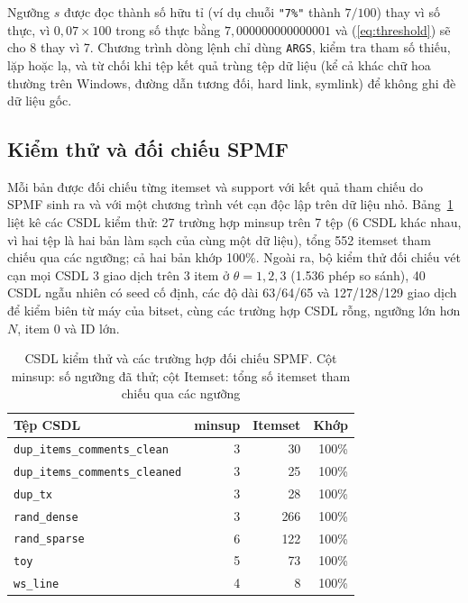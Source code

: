 Ngưỡng $s$ được đọc thành số hữu tỉ (ví dụ chuỗi \texttt{"7\%"} thành $7/100$) thay vì số thực, vì
$0{,}07 \times 100$ trong số thực bằng $7{,}000000000000001$ và (\ref{eq:threshold}) sẽ cho 8 thay vì 7.
Chương trình dòng lệnh chỉ dùng \texttt{ARGS}, kiểm tra tham số thiếu, lặp hoặc lạ, và từ chối khi tệp kết
quả trùng tệp dữ liệu (kể cả khác chữ hoa thường trên Windows, đường dẫn tương đối, hard link, symlink) để
không ghi đè dữ liệu gốc.

\subsection{Kiểm thử và đối chiếu SPMF}

Mỗi bản được đối chiếu từng itemset và support với kết quả tham chiếu do SPMF sinh ra và với một chương trình
vét cạn độc lập trên dữ liệu nhỏ. Bảng~\ref{tab:fixtures} liệt kê các CSDL kiểm thử: 27 trường hợp minsup trên
7 tệp (6 CSDL khác nhau, vì hai tệp là hai bản làm sạch của cùng một dữ liệu), tổng 552 itemset tham chiếu
qua các ngưỡng; cả hai bản khớp 100\%. Ngoài ra, bộ kiểm thử đối chiếu vét cạn mọi CSDL 3 giao dịch trên 3 item ở
$\theta = 1, 2, 3$ (1.536 phép so sánh), 40 CSDL ngẫu nhiên có seed cố định, các độ dài 63/64/65 và 127/128/129
giao dịch để kiểm biên từ máy của bitset, cùng các trường hợp CSDL rỗng, ngưỡng lớn hơn $N$, item 0 và ID lớn.

\begin{table}[t]
\caption{CSDL kiểm thử và các trường hợp đối chiếu SPMF. Cột minsup: số ngưỡng đã thử; cột Itemset: tổng
số itemset tham chiếu qua các ngưỡng}
\label{tab:fixtures}
\centering
\footnotesize
\setlength{\tabcolsep}{4pt}
\begin{tabular}{@{}lrrr@{}}
\toprule
Tệp CSDL & minsup & Itemset & Khớp \\
\midrule
\texttt{dup\_items\_comments\_clean} & 3 & 30 & 100\% \\
\texttt{dup\_items\_comments\_cleaned} & 3 & 25 & 100\% \\
\texttt{dup\_tx} & 3 & 28 & 100\% \\
\texttt{rand\_dense} & 3 & 266 & 100\% \\
\texttt{rand\_sparse} & 6 & 122 & 100\% \\
\texttt{toy} & 5 & 73 & 100\% \\
\texttt{ws\_line} & 4 & 8 & 100\% \\
\bottomrule
\end{tabular}
\end{table}

